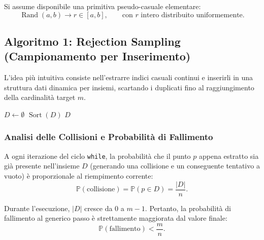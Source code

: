 Si assume disponibile una primitiva pseudo-casuale elementare:
\begin{equation}
  \operatorname{Rand}(a, b) \to r \in [a, b], \qquad \text{con } r \text{ intero distribuito uniformemente.}
\end{equation}

\subsection{Algoritmo 1: Rejection Sampling (Campionamento per Inserimento)}
L'idea più intuitiva consiste nell'estrarre indici casuali continui e inserirli in una struttura dati dinamica per insiemi, scartando i duplicati fino al raggiungimento della cardinalità target $m$.

\begin{algorithm}[H]
  \caption{Rejection Sampling per Inserimento Casuale}
  \label{alg:rejection-sampling}
  $D \leftarrow \emptyset$\;
  $\operatorname{Sort}(D)$\;
  \Return $D$\;
\end{algorithm}

\subsubsection{Analisi delle Collisioni e Probabilità di Fallimento}
A ogni iterazione del ciclo \texttt{while}, la probabilità che il punto $p$ appena estratto sia già presente nell'insieme $D$ (generando una collisione e un conseguente tentativo a vuoto) è proporzionale al riempimento corrente:
\begin{equation}
  \mathbb{P}(\text{collisione}) = \mathbb{P}(p \in D) = \frac{|D|}{n}.
\end{equation}

Durante l'esecuzione, $|D|$ cresce da $0$ a $m - 1$. Pertanto, la probabilità di fallimento al generico passo è strettamente maggiorata dal valore finale:
\begin{equation}
  \mathbb{P}(\text{fallimento}) < \frac{m}{n}.
\end{equation}

